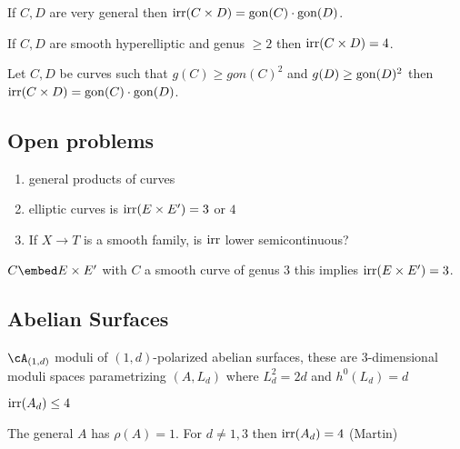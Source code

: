 \documentclass[12pt]{article}
\begin{document}
\begin{conj}[C-Martin]
If $C,D$ are very general then $\mathrm{irr}(C \times D) = \mathrm{gon}(C) \cdot \mathrm{gon}(D)$.
\end{conj}

\begin{theorem}[C-Martin]
If $C, D$ are smooth hyperelliptic and genus $\ge 2$ then $\mathrm{irr}(C \times D) = 4$. 
\end{theorem}

\begin{theorem}
Let $C, D$ be curves such that $g(C) \ge gon(C)^2$ and $g(D) \ge \mathrm{gon}(D)^2$ then $\mathrm{irr}(C \times D) = \mathrm{gon}(C) \cdot \mathrm{gon}(D)$.
\end{theorem}

\subsection{Open problems}

\begin{enumerate}
\item general products of curves
\item elliptic curves is $\mathrm{irr}(E \times E') = 3$ or $4$
\item If $X \to T$ is a smooth family, is $\mathrm{irr}$ lower semicontinuous? 
\end{enumerate}

\begin{example}[Yoshihara]
$C \embed E \times E'$ with $C$ a smooth curve of genus $3$ this implies $\mathrm{irr}(E \times E') = 3$.
\end{example}

\subsection{Abelian Surfaces}

$\cA_{(1,d)}$ moduli of $(1,d)$-polarized abelian surfaces, these are $3$-dimensional moduli spaces parametrizing $(A, L_d)$ where $L_d^2 = 2d$ and $h^0(L_d) = d$

\begin{theorem}[C-Stapleton]
$\mathrm{irr}(A_d) \le 4$
\end{theorem}

The general $A$ has $\rho(A) = 1$. For $d \neq 1,3$ then $\mathrm{irr}(A_d) = 4$ (Martin) 
\end{document}
